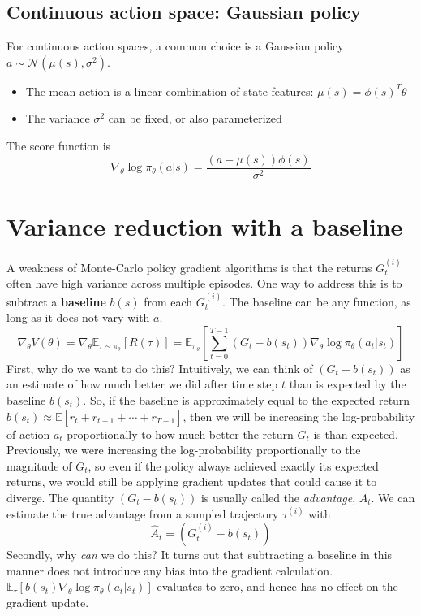 \documentclass{article}
\newcommand{\E}{\mathbb{E}}                                        %
\begin{document}
\subsection{Continuous action space: Gaussian policy}
For continuous action spaces, a common choice is a Gaussian policy $a \sim \mathcal{N} (\mu(s), \sigma^2)$.
\begin{itemize}
\item The mean action is a linear combination of state features: $\mu(s) = \phi(s)^T \theta$
\item The variance $\sigma^2$ can be fixed, or also parameterized
\end{itemize}
The score function is
\[ \nabla_\theta \log \pi_\theta(a|s) = \frac{(a - \mu(s)) \phi(s)}{\sigma^2} \]


\section{Variance reduction with a baseline}
A weakness of Monte-Carlo policy gradient algorithms is that the returns $G_t^{(i)}$ often have high variance across multiple episodes. One way to address this is to subtract a \textbf{baseline} $b(s)$ from each $G_t^{(i)}$. The baseline can be any function, as long as it does not vary with $a$.
\[
\nabla_\theta V(\theta)
= \nabla_\theta \E_{\tau \sim \pi_\theta} [R(\tau)]
= \E_{\pi_\theta} \left[ \sum_{t=0}^{T-1} \left( G_t - b(s_t) \right) \nabla_\theta \log \pi_\theta(a_t | s_t) \right]
\]
First, why do we want to do this? Intuitively, we can think of $( G_t - b(s_t) )$ as an estimate of how much better we did after time step $t$ than is expected by the baseline $b(s_t)$. So, if the baseline is approximately equal to the expected return $b(s_t) \approx \E[r_t + r_{t+1} + \cdots + r_{T-1}]$, then we will be increasing the log-probability of action $a_t$ proportionally to how much better the return $G_t$ is than expected. Previously, we were increasing the log-probability proportionally to the magnitude of $G_t$, so even if the policy always achieved exactly its expected returns, we would still be applying gradient updates that could cause it to diverge. The quantity $( G_t - b(s_t) )$ is usually called the \emph{advantage}, $A_t$. We can estimate the true advantage from a sampled trajectory $\tau^{(i)}$ with
\[ \hat{A}_t = ( G_t^{(i)} - b(s_t) ) \]
Secondly, why \emph{can} we do this? It turns out that subtracting a baseline in this manner does not introduce any bias into the gradient calculation. $\E_\tau [b(s_t) \nabla_\theta \log \pi_\theta(a_t | s_t)]$ evaluates to zero, and hence has no effect on the gradient update.
\end{document}
